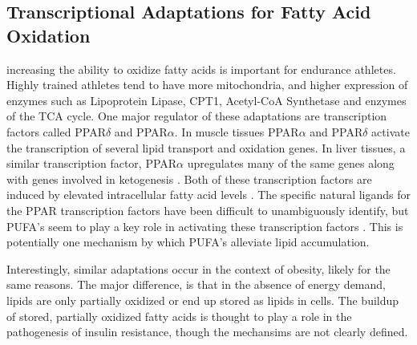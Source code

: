 \documentclass{tufte-handout}
\begin{document}
\subsection{Transcriptional Adaptations for Fatty Acid Oxidation}

 increasing the ability to oxidize fatty acids is important for endurance athletes.  Highly trained athletes tend to have more mitochondria, and higher expression of enzymes such as Lipoprotein Lipase, CPT1, Acetyl-CoA Synthetase and enzymes of the TCA cycle.  One major regulator of these adaptations are transcription factors called PPAR$\delta$ and PPAR$\alpha$.  In muscle tissues PPAR$\alpha$ and PPAR$\delta$  activate the transcription of several lipid transport and oxidation genes.  In liver tissues, a similar transcription factor, PPAR$\alpha$ upregulates many of the same genes along with genes involved in ketogenesis \citep{Kersten2000,Badman2007}.  Both of these transcription factors are induced by elevated intracellular fatty acid levels \citep{Keller1993}.  The specific natural ligands for the PPAR transcription factors have been difficult to unambiguously identify, but PUFA's seem to play a key role in activating these transcription factors \citep{Forman1997}.  This is potentially one mechanism by which PUFA's alleviate lipid accumulation.

Interestingly, similar adaptations occur in the context of obesity, likely for the same reasons.  The major difference, is that in the absence of energy demand, lipids are only partially oxidized or end up stored as lipids in cells.  The buildup of stored, partially oxidized fatty acids is thought to play a role in the pathogenesis of insulin resistance, though the mechansims are not clearly defined.






\end{document}
